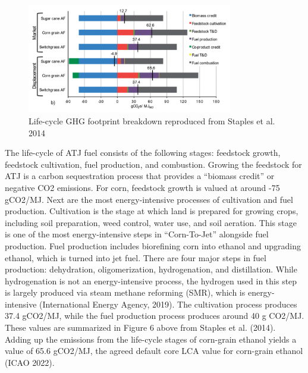 \documentclass[12pt]{article}
\begin{document}
\begin{Appendix}
\begin{figure}[H]
\centering
\includegraphics[width=0.8\textwidth]{Fig 6.png} %
\caption{Life-cycle GHG footprint breakdown reproduced from Staples et al. 2014}
\label{figure 6}
\end{figure}


 The life-cycle of ATJ fuel consists of the following stages: feedstock growth, feedstock cultivation, fuel production, and combustion. Growing the feedstock for ATJ is a carbon sequestration process that provides a “biomass credit” or negative CO2 emissions. For corn, feedstock growth is valued at around -75 gCO2/MJ. Next are the most energy-intensive processes of cultivation and fuel production. Cultivation is the stage at which land is prepared for growing crops, including soil preparation, weed control, water use, and soil aeration. This stage is one of the most energy-intensive steps in “Corn-To-Jet” alongside fuel production. Fuel production includes biorefining corn into ethanol and upgrading ethanol, which is turned into jet fuel. There are four major steps in fuel production: dehydration, oligomerization, hydrogenation, and distillation. While hydrogenation is not an energy-intensive process, the hydrogen used in this step is largely produced via steam methane reforming (SMR), which is energy-intensive (International Energy Agency, 2019).  The cultivation process produces 37.4 gCO2/MJ, while the fuel production process produces around 40 g CO2/MJ. These values are summarized in Figure 6 above from Staples et al. (2014). Adding up the emissions from the life-cycle stages of corn-grain ethanol yields a value of 65.6 gCO2/MJ, the agreed default core LCA value for corn-grain ethanol (ICAO 2022).


\end{Appendix}
\end{document}
